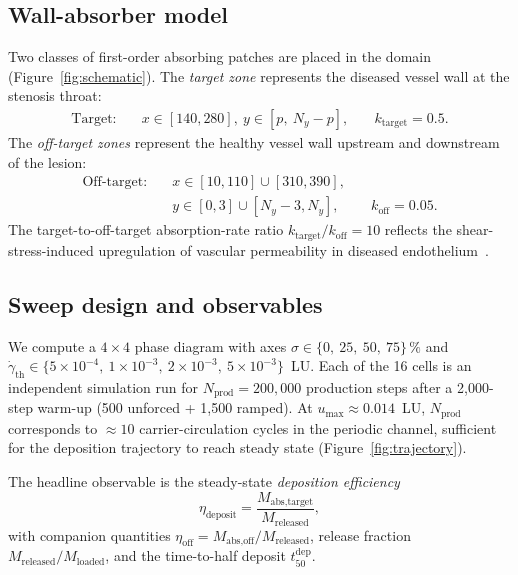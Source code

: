 \documentclass[11pt,a4paper]{article}
\begin{document}
\subsection{Wall-absorber model}
\label{sec:methods-walls}

Two classes of first-order absorbing patches are placed in the
domain (Figure~\ref{fig:schematic}). The \emph{target zone}
represents the diseased vessel wall at the stenosis throat:
\begin{equation}
\begin{aligned}
\text{Target:}\quad
& x \in [140, 280],\ y \in [p,\ N_y - p],
& \quad k_{\text{target}} = 0.5.
\end{aligned}
\label{eq:target}
\end{equation}
The \emph{off-target zones} represent the healthy vessel wall
upstream and downstream of the lesion:
\begin{equation}
\begin{aligned}
\text{Off-target:}\quad
& x \in [10, 110] \cup [310, 390],\\
& y \in [0, 3] \cup [N_y - 3, N_y],
& \quad k_{\text{off}} = 0.05.
\end{aligned}
\label{eq:offtarget}
\end{equation}
The target-to-off-target absorption-rate ratio
$k_{\text{target}}/k_{\text{off}} = 10$ reflects the
shear-stress-induced upregulation of vascular permeability
in diseased endothelium~\citep{malek1999hemodynamic}.

\subsection{Sweep design and observables}
\label{sec:methods-sweep}

We compute a $4 \times 4$ phase diagram with axes
$\sigma \in \{0,\ 25,\ 50,\ 75\}\,\%$ and
$\dot\gamma_{\text{th}} \in
\{5\times 10^{-4},\ 1\times 10^{-3},\ 2\times 10^{-3},\ 5\times 10^{-3}\}$~LU.
Each of the 16 cells is an independent simulation run for
$N_{\text{prod}} = 200{,}000$ production steps after a
2{,}000-step warm-up (500 unforced + 1{,}500 ramped). At
$u_{\max} \approx 0.014$~LU, $N_{\text{prod}}$ corresponds to
${\approx}10$ carrier-circulation cycles in the periodic channel,
sufficient for the deposition trajectory to reach steady state
(Figure~\ref{fig:trajectory}).

The headline observable is the steady-state
\emph{deposition efficiency}
\begin{equation}
\eta_{\text{deposit}} =
   \frac{M_{\text{abs,target}}}{M_{\text{released}}},
\label{eq:eta-deposit}
\end{equation}
with companion quantities
$\eta_{\text{off}} = M_{\text{abs,off}}/M_{\text{released}}$,
release fraction
$M_{\text{released}}/M_{\text{loaded}}$, and the time-to-half
deposit $t_{50}^{\text{dep}}$.
\end{document}
